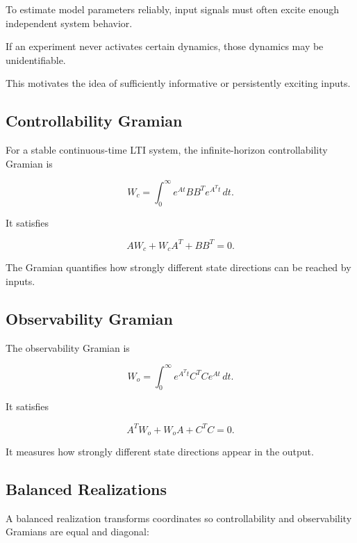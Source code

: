 To estimate model parameters reliably, input signals must often excite enough
independent system behavior.

If an experiment never activates certain dynamics, those dynamics may be
unidentifiable.

This motivates the idea of sufficiently informative or persistently exciting
inputs.

\subsection{Controllability Gramian}
\label{subsec:controllability-gramian}

For a stable continuous-time LTI system, the infinite-horizon controllability
Gramian is

\[
\boxed{
W_c
=
\int_0^\infty
e^{At}
BB^T
e^{A^Tt}
\,dt.
}
\]

It satisfies

\[
\boxed{
AW_c
+
W_cA^T
+
BB^T
=
0.
}
\]

The Gramian quantifies how strongly different state directions can be reached
by inputs.

\subsection{Observability Gramian}
\label{subsec:observability-gramian}

The observability Gramian is

\[
\boxed{
W_o
=
\int_0^\infty
e^{A^Tt}
C^TC
e^{At}
\,dt.
}
\]

It satisfies

\[
\boxed{
A^TW_o
+
W_oA
+
C^TC
=
0.
}
\]

It measures how strongly different state directions appear in the output.

\subsection{Balanced Realizations}
\label{subsec:balanced-realizations}

A balanced realization transforms coordinates so controllability and
observability Gramians are equal and diagonal:


